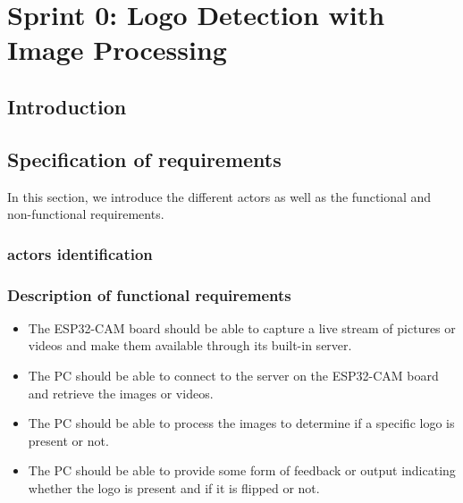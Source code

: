 %
%


\chapter{Sprint 0: Logo Detection with Image Processing}

\section*{Introduction}
\section{Specification of requirements}
In this section, we introduce the different actors as well as the functional and non-functional requirements.
\subsection{actors identification }
\subsection{Description of functional requirements}
\begin{itemize}
\item The ESP32-CAM board should be able to capture a live stream of pictures or videos and make them available through its built-in server.
\item The PC should be able to connect to the server on the ESP32-CAM board and retrieve the images or videos.
\item The PC should be able to process the images to determine if a specific logo is present or not.
\item The PC should be able to provide some form of feedback or output indicating whether the logo is present and if it is flipped or not.
\end{itemize}
